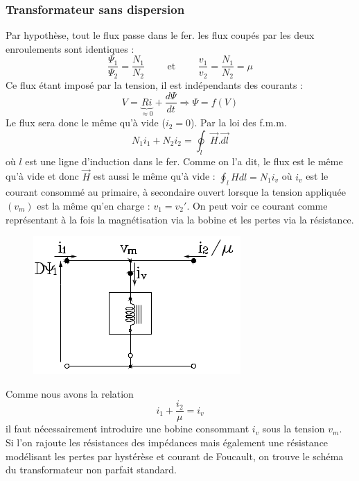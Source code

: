 		\subsubsection{Transformateur sans dispersion}
		Par hypothèse, tout le flux passe dans le fer. les flux coupés par les deux 
		enroulements sont identiques :
		\begin{equation}
		\frac{\Psi_1}{\Psi_2} = \frac{N_1}{N_2}\qquad\text{ et }\qquad \frac{v_1}{
		v_2}=\frac{N_1}{N_2} = \mu
		\end{equation}
		Ce flux étant imposé par la tension, il est indépendants des courants :
		\begin{equation}
		V = \underbrace{Ri}_{\approx0} + \dfrac{d\Psi}{dt} \Rightarrow \Psi = f(V)
		\end{equation}				
		Le flux sera donc le même qu'à vide ($i_2 = 0$).
		Par la loi des f.m.m.
		\begin{equation}
		N_1i_1 + N_2i_2 = \oint_l \vec{H}.\vec{dl}
		\end{equation}
		où $l$ est une ligne d'induction dans le fer. Comme on l'a dit, le flux est le 
		même qu'à vide et donc $\vec{H}$ est aussi le même 
		qu'à vide : $\oint_l Hdl = N_1i_v$ où $i_v$ est le courant consommé 
		au primaire, à secondaire ouvert lorsque la tension appliquée $(v_m)$ est 
		la même qu'en charge : $v_1=v_2'$. On peut voir ce courant comme représentant à 
		la fois la magnétisation via la bobine et les pertes via la résistance.\\
		\begin{figure}
		\vspace{-8mm}
		\includegraphics[scale=0.4]{ch3/imager1.png}
		\end{figure}
		Comme nous avons la relation
		\begin{equation}
		i_1 + \frac{i_2}{\mu} = i_v
		\end{equation}
		il faut nécessairement introduire une bobine consommant $i_v$ sous la 
		tension $v_m$. 	\\
		Si l'on rajoute les résistances des impédances mais également une résistance 
		modélisant les pertes par hystérèse et courant de Foucault, on trouve le 
		schéma du transformateur non parfait standard.
	
